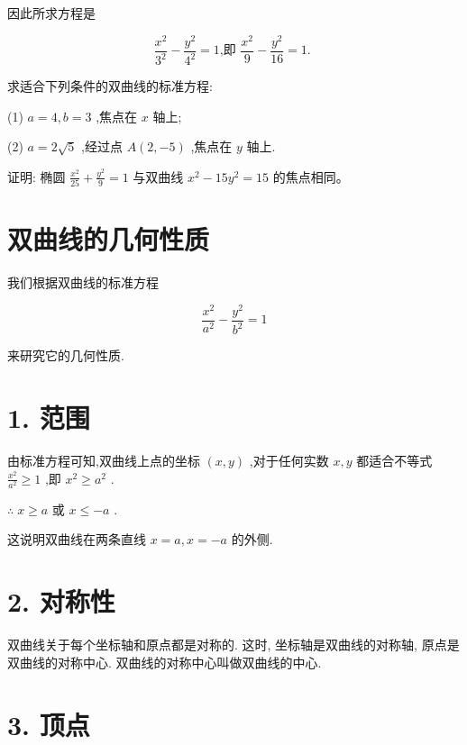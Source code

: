 \documentclass[lang=cn,newtx,10.5pt,scheme=chinese]{elegantbook}
\begin{document}
因此所求方程是

\[
  \frac{{x}^{2}}{{3}^{2}} - \frac{{y}^{2}}{{4}^{2}} = 1\text{,即 }\frac{{x}^{2}}{9} - \frac{{y}^{2}}{16} = 1\text{. }
\]

\begin{problemset}[练习]

\item 求适合下列条件的双曲线的标准方程:

(1) \(a = 4,b = 3\) ,焦点在 \(x\) 轴上;

(2) \(a = 2\sqrt{5}\) ,经过点 \(A\left( {2, - 5}\right)\) ,焦点在 \(y\) 轴上.

\item 证明: 椭圆 \(\frac{{x}^{2}}{25} + \frac{{y}^{2}}{9} = 1\) 与双曲线 \({x}^{2} - {15}{y}^{2} = {15}\) 的焦点相同。

\end{problemset}

\section{双曲线的几何性质}

我们根据双曲线的标准方程

\[
  \frac{{x}^{2}}{{a}^{2}} - \frac{{y}^{2}}{{b}^{2}} = 1
\]

来研究它的几何性质.

\section*{1. 范围}

由标准方程可知,双曲线上点的坐标 \(\left( {x,y}\right)\) ,对于任何实数 \(x,y\) 都适合不等式 \(\frac{{x}^{2}}{{a}^{2}} \geq 1\) ,即 \({x}^{2} \geq {a}^{2}\) .

\(\therefore \;x \geq a\) 或 \(x \leq - a\) .

这说明双曲线在两条直线 \(x = a,x = - a\) 的外侧.

\section*{2. 对称性}

双曲线关于每个坐标轴和原点都是对称的. 这时, 坐标轴是双曲线的对称轴, 原点是双曲线的对称中心. 双曲线的对称中心叫做双曲线的中心.

\section*{3. 顶点}
\end{document}
